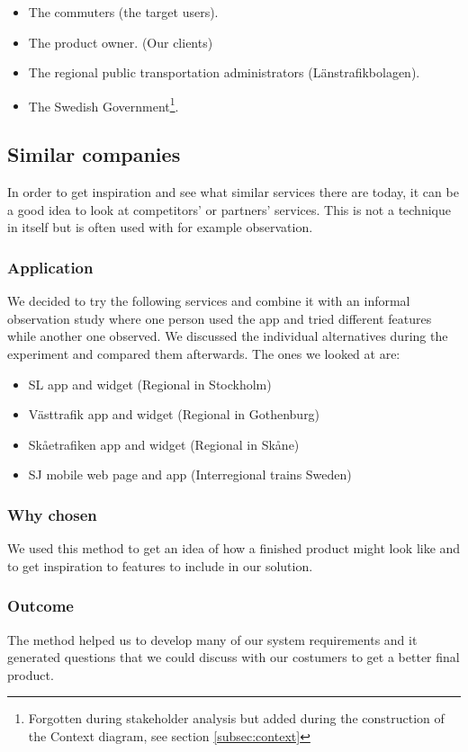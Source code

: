 \documentclass[a4paper]{article}
\begin{document}
		\begin{itemize}
			\item The commuters (the target users).
			\item The product owner. (Our clients)
			\item The regional public transportation administrators (Länstrafikbolagen). 
			\item The Swedish Government\footnote{Forgotten during stakeholder analysis but added during the construction of the Context diagram, see section \ref{subsec:context}}.
		\end{itemize}
		
		\subsection{Similar companies}
In order to get inspiration and see what similar services there are today, it can be a good idea to look at competitors' or partners' services. This is not a technique in itself but is often used with for example observation.
	
		\subsubsection{Application}
We decided to try the following services and combine it with an informal observation study where one person used the app and tried different features while another one observed. We discussed the individual alternatives during the experiment and compared them afterwards. The ones we looked at are:
	\begin{itemize}
		\item SL app and widget (Regional in Stockholm)
		\item Västtrafik app and widget (Regional in Gothenburg)
		\item Skåetrafiken app and widget (Regional in Skåne)
		\item SJ mobile web page and app (Interregional trains Sweden)
	\end{itemize}
	
		\subsubsection{Why chosen}
We used this method to get an idea of how a finished product might look like
and to get inspiration to features to include in our solution.
		\subsubsection{Outcome}
The method helped us to develop many of our system requirements and it generated questions that we could discuss with our costumers to get a better final product.
\end{document}
